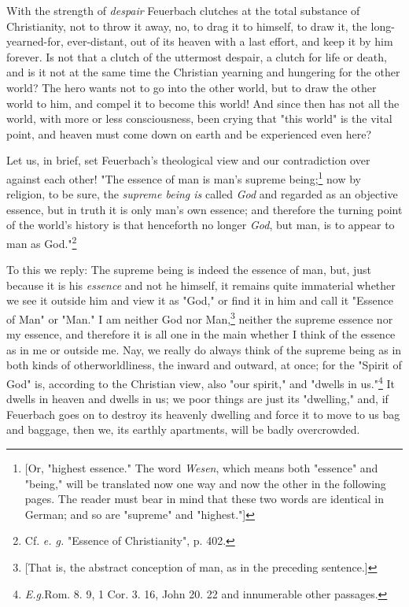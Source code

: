 \documentclass[a4paper]{book}
\begin{document}
With the strength of \textit{despair} Feuerbach clutches at the total 
substance of Christianity, not to throw it away, no, to drag it to himself, to 
draw it, the long-yearned-for, ever-distant, out of its heaven with a last 
effort, and keep it by him forever. Is not that a clutch of the uttermost 
despair, a clutch for life or death, and is it not at the same time the 
Christian yearning and hungering for the other world? The hero wants not to go 
into the other world, but to draw the other world to him, and compel it to 
become this world! And since then has not all the world, with more or less 
consciousness, been crying that "{}this world"{} is the vital point, and 
heaven must come down on earth and be experienced even here?

Let us, in brief, set Feuerbach's theological view and our contradiction over 
against each other! "{}The essence of man is man's supreme 
being;\footnote{[Or, "{}highest essence."{} The word \textit{Wesen}, which 
means both "{}essence"{} and "{}being,"{} will be translated now one way and 
now the other in the following pages. The reader must bear in mind that these 
two words are identical in German; and so are "{}supreme"{} and 
"{}highest."{}]} now by religion, to be sure, the \textit{supreme being is} 
called \textit{God} and regarded as an objective essence, but in truth it is 
only man's own essence; and therefore the turning point of the world's history 
is that henceforth no longer \textit{God}, but man, is to appear to man as 
God."{}\footnote{Cf. \textit{e. g.} "{}Essence of Christianity"{}, p. 402.}

To this we reply: The supreme being is indeed the essence of man, but, just 
because it is his \textit{essence} and not he himself, it remains quite 
immaterial whether we see it outside him and view it as "{}God,"{} or find it 
in him and call it "{}Essence of Man"{} or "{}Man."{} I am neither God nor 
Man,\footnote{[That is, the abstract conception of man, as in the preceding 
sentence.]} neither the supreme essence nor my essence, and therefore it is 
all one in the main whether I think of the essence as in me or outside me. 
Nay, we really do always think of the supreme being as in both kinds of 
otherworldliness, the inward and outward, at once; for the "{}Spirit of God"{} 
is, according to the Christian view, also "{}our spirit,"{} and "{}dwells in 
us."{}\footnote{\textit{E.g.}Rom. 8. 9, 1 Cor. 3. 16, John 20. 22 and 
innumerable other passages.} It dwells in heaven and dwells in us; we poor 
things are just its "{}dwelling,"{} and, if Feuerbach goes on to destroy its 
heavenly dwelling and force it to move to us bag and baggage, then we, its 
earthly apartments, will be badly overcrowded.
\end{document}
